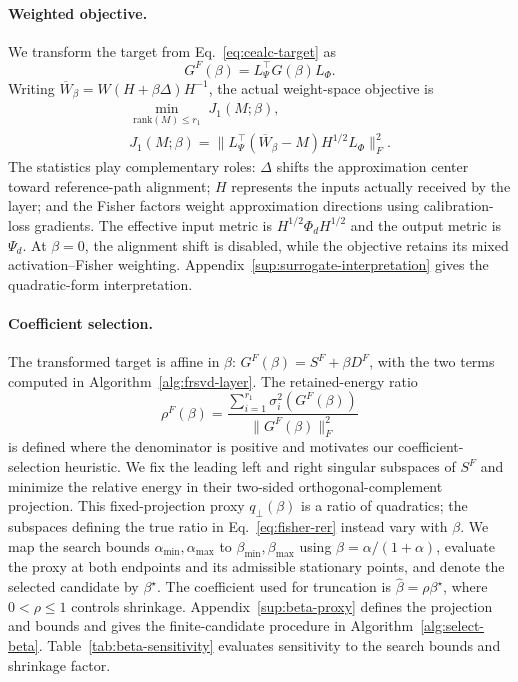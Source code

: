 \documentclass[11pt]{article}
\begin{document}
\paragraph{Weighted objective.}
We transform the target from Eq.~\eqref{eq:cealc-target} as
\begin{equation}
G^F(\beta)=L_\Psi^\top G(\beta)L_\Phi.
\label{eq:fisher-target}
\end{equation}
Writing $\overline W_\beta=W(H+\beta\Delta)H^{-1}$, the actual weight-space objective is
\begin{equation}
\begin{aligned}
\min_{\mathrm{rank}(M)\le r_1}\;J_1(M;\beta),\\
J_1(M;\beta)=\|L_\Psi^\top(\overline W_\beta-M)
H^{1/2}L_\Phi\|_F^2.
\end{aligned}
\label{eq:stage1-objective}
\end{equation}
The statistics play complementary roles: $\Delta$ shifts the approximation center toward reference-path alignment; $H$ represents the inputs actually received by the layer; and the Fisher factors weight approximation directions using calibration-loss gradients. The effective input metric is $H^{1/2}\Phi_dH^{1/2}$ and the output metric is $\Psi_d$. At $\beta=0$, the alignment shift is disabled, while the objective retains its mixed activation--Fisher weighting. Appendix~\ref{sup:surrogate-interpretation} gives the quadratic-form interpretation.

\paragraph{Coefficient selection.}
The transformed target is affine in $\beta$: $G^F(\beta)=S^F+\beta D^F$, with the two terms computed in Algorithm~\ref{alg:frsvd-layer}. The retained-energy ratio
\begin{equation}
\rho^F(\beta)=
\frac{\sum_{i=1}^{r_1}\sigma_i^2(G^F(\beta))}
{\|G^F(\beta)\|_F^2}
\label{eq:fisher-rer}
\end{equation}
is defined where the denominator is positive and motivates our coefficient-selection heuristic. We fix the leading left and right singular subspaces of $S^F$ and minimize the relative energy in their two-sided orthogonal-complement projection. This fixed-projection proxy $q_\perp(\beta)$ is a ratio of quadratics; the subspaces defining the true ratio in Eq.~\eqref{eq:fisher-rer} instead vary with $\beta$. We map the search bounds $\alpha_{\min},\alpha_{\max}$ to $\beta_{\min},\beta_{\max}$ using $\beta=\alpha/(1+\alpha)$, evaluate the proxy at both endpoints and its admissible stationary points, and denote the selected candidate by $\beta^\star$. The coefficient used for truncation is $\widehat\beta=\rho\beta^\star$, where $0<\rho\le1$ controls shrinkage. Appendix~\ref{sup:beta-proxy} defines the projection and bounds and gives the finite-candidate procedure in Algorithm~\ref{alg:select-beta}. Table~\ref{tab:beta-sensitivity} evaluates sensitivity to the search bounds and shrinkage factor.
\end{document}
